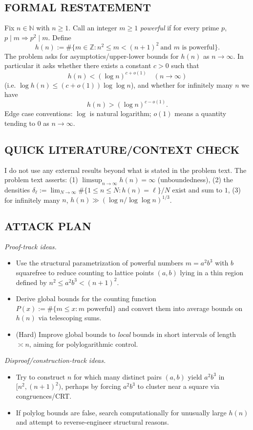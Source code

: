 \subsection*{FORMAL RESTATEMENT}
Fix $n\in\mathbb{N}$ with $n\ge 1$. Call an integer $m\ge 1$ \emph{powerful} if for every prime $p$, $p\mid m\Rightarrow p^2\mid m$.
Define
\[
 h(n) := \#\{m\in\mathbb{Z}: n^2\le m < (n+1)^2 \ \text{and $m$ is powerful}\}.
\]
The problem asks for asymptotics/upper-lower bounds for $h(n)$ as $n\to\infty$.
In particular it asks whether there exists a constant $c>0$ such that
\[
 h(n) < (\log n)^{c+o(1)} \quad (n\to\infty)
\]
(i.e. $\log h(n) \le (c+o(1))\log\log n$), and whether for infinitely many $n$ we have
\[
 h(n) > (\log n)^{c-o(1)}.
\]
Edge case conventions: $\log$ is natural logarithm; $o(1)$ means a quantity tending to $0$ as $n\to\infty$.

\subsection*{QUICK LITERATURE/CONTEXT CHECK}
I do not use any external results beyond what is stated in the problem text. The problem text asserts:
(1) $\limsup_{n\to\infty} h(n)=\infty$ (unboundedness),
(2) the densities $\delta_\ell := \lim_{N\to\infty} \#\{1\le n\le N: h(n)=\ell\}/N$ exist and sum to $1$,
(3) for infinitely many $n$, $h(n) \gg (\log n/\log\log n)^{1/3}$.

\subsection*{ATTACK PLAN}
\emph{Proof-track ideas.}
\begin{itemize}
\item Use the structural parametrization of powerful numbers $m=a^2b^3$ with $b$ squarefree to reduce counting to lattice points $(a,b)$ lying in a thin region defined by $n^2\le a^2b^3<(n+1)^2$.
\item Derive global bounds for the counting function $P(x):=\#\{m\le x: m\text{ powerful}\}$ and convert them into average bounds on $h(n)$ via telescoping sums.
\item (Hard) Improve global bounds to \emph{local} bounds in short intervals of length $\asymp n$, aiming for polylogarithmic control.
\end{itemize}
\emph{Disproof/construction-track ideas.}
\begin{itemize}
\item Try to construct $n$ for which many distinct pairs $(a,b)$ yield $a^2b^3$ in $[n^2,(n+1)^2)$, perhaps by forcing $a^2b^3$ to cluster near a square via congruences/CRT.
\item If polylog bounds are false, search computationally for unusually large $h(n)$ and attempt to reverse-engineer structural reasons.
\end{itemize}

